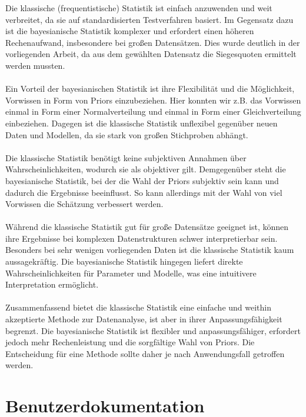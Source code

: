 \documentclass[a4paper,12pt]{article}
\begin{document}
\noindent
Die klassische (frequentistische) Statistik ist einfach anzuwenden und weit verbreitet, da 
sie auf standardisierten Testverfahren basiert. Im Gegensatz dazu ist die bayesianische Statistik 
komplexer und erfordert einen höheren Rechenaufwand, insbesondere bei großen Datensätzen.
Dies wurde deutlich in der vorliegenden Arbeit, da aus dem gewählten Datensatz die 
Siegesquoten ermittelt werden mussten. \\\\
Ein Vorteil der bayesianischen Statistik ist ihre Flexibilität und die Möglichkeit, Vorwissen 
in Form von Priors einzubeziehen. Hier konnten wir z.B. das Vorwissen
einmal in Form einer Normalverteilung und einmal in Form einer Gleichverteilung einbeziehen.
Dagegen ist die klassische Statistik unflexibel gegenüber 
neuen Daten und Modellen, da sie stark von großen Stichproben abhängt. \\\\
Die klassische Statistik benötigt keine subjektiven Annahmen über Wahrscheinlichkeiten, wodurch 
sie als objektiver gilt. Demgegenüber steht die bayesianische Statistik, bei der die Wahl der 
Priors subjektiv sein kann und dadurch die Ergebnisse beeinflusst. So kann allerdings mit der Wahl von 
viel Vorwissen die Schätzung verbessert werden. \parencite[127]{StatistikKlassischOderBayes} \\\\
Während die klassische Statistik gut für große Datensätze geeignet ist, können ihre Ergebnisse 
bei komplexen Datenstrukturen schwer interpretierbar sein. Besonders bei sehr wenigen vorliegenden Daten
ist die klassische Statistik kaum aussagekräftig.
Die bayesianische Statistik hingegen liefert direkte Wahrscheinlichkeiten für Parameter und Modelle, 
was eine intuitivere Interpretation ermöglicht. \\\\
Zusammenfassend bietet die klassische Statistik eine einfache und weithin akzeptierte Methode 
zur Datenanalyse, ist aber in ihrer Anpassungsfähigkeit begrenzt. Die bayesianische Statistik 
ist flexibler und anpassungsfähiger, erfordert jedoch mehr Rechenleistung und die sorgfältige 
Wahl von Priors. Die Entscheidung für eine Methode sollte daher je nach Anwendungsfall getroffen werden.

\newpage

\section{Benutzerdokumentation}
\end{document}
